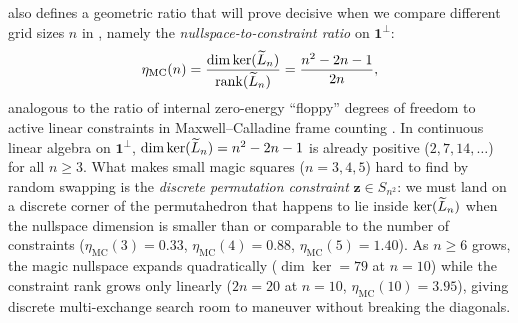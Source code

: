  also defines a geometric ratio that will prove decisive when we compare different grid sizes $n$ in , namely the \emph{nullspace-to-constraint ratio} on $\mathbf{1}^\perp$:
\begin{equation}
  \eta_{\mathrm{MC}}(n) = \frac{\dim\ker(\widetilde{L}_n)}{\operatorname{rank}(\widetilde{L}_n)} = \frac{n^2 - 2n - 1}{2n},
  \label{eq:maxwell_calladine_ratio}
\end{equation}
analogous to the ratio of internal zero-energy ``floppy'' degrees of freedom to active linear constraints in Maxwell--Calladine frame counting \cite{maxwell1864calculation,calladine1978buckminster}. In continuous linear algebra on $\mathbf{1}^\perp$, $\dim\ker(\widetilde{L}_n) = n^2-2n-1$ is already positive ($2, 7, 14, \dots$) for all $n \ge 3$. What makes small magic squares ($n=3,4,5$) hard to find by random swapping is the \emph{discrete permutation constraint} $\mathbf{z} \in S_{n^2}$: we must land on a discrete corner of the permutahedron that happens to lie inside $\ker(\widetilde{L}_n)$ when the nullspace dimension is smaller than or comparable to the number of constraints ($\eta_{\mathrm{MC}}(3)=0.33$, $\eta_{\mathrm{MC}}(4)=0.88$, $\eta_{\mathrm{MC}}(5)=1.40$). As $n \ge 6$ grows, the magic nullspace expands quadratically ($\dim\ker = 79$ at $n=10$) while the constraint rank grows only linearly ($2n = 20$ at $n=10$, $\eta_{\mathrm{MC}}(10) = 3.95$), giving discrete multi-exchange search room to maneuver without breaking the diagonals.
